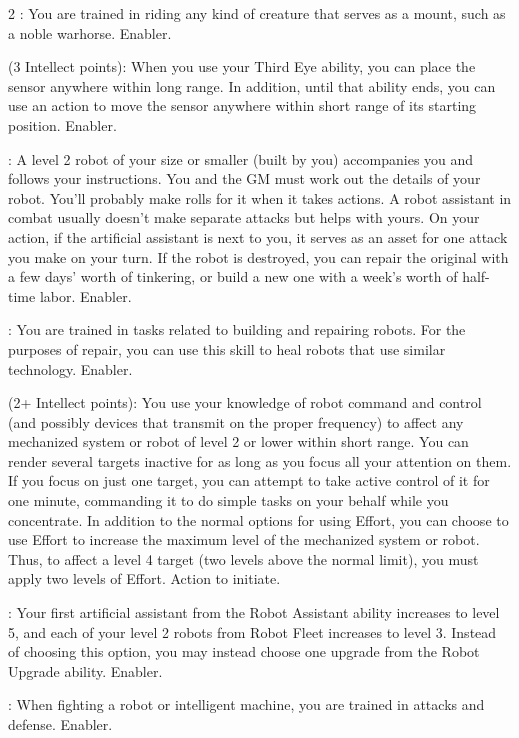\begin{multicols}{2}
: You are trained in riding any kind of creature that serves as a mount, such as a noble warhorse. Enabler. 
 
 (3 Intellect points): When you use your Third Eye ability, you can place the sensor anywhere within long range. In addition, until that ability ends, you can use an action to move the sensor anywhere within short range of its starting position. Enabler. 
 
: A level 2 robot of your size or smaller (built by you) accompanies you and follows your instructions. You and the GM must work out the details of your robot. You’ll probably make rolls for it when it takes actions. A robot assistant in combat usually doesn’t make separate attacks but helps with yours. On your action, if the artificial assistant is next to you, it serves as an asset for one attack you make on your turn. If the robot is destroyed, you can repair the original with a few days’ worth of tinkering, or build a new one with a week’s worth of half-time labor. Enabler. 
 
: You are trained in tasks related to building and repairing robots. For the purposes of repair, you can use this skill to heal robots that use similar technology. Enabler. 
 
 (2+ Intellect points): You use your knowledge of robot command and control (and possibly devices that transmit on the proper frequency) to affect any mechanized system or robot of level 2 or lower within short range. You can render several targets inactive for as long as you focus all your attention on them. If you focus on just one target, you can attempt to take active control of it for one minute, commanding it to do simple tasks on your behalf while you concentrate. In addition to the normal options for using Effort, you can choose to use Effort to increase the maximum level of the mechanized system or robot. Thus, to affect a level 4 target (two levels above the normal limit), you must apply two levels of Effort. Action to initiate. 
 
: Your first artificial assistant from the Robot Assistant ability increases to level 5, and each of your level 2 robots from Robot Fleet increases to level 3. Instead of choosing this option, you may instead choose one upgrade from the Robot Upgrade ability. Enabler. 
 
: When fighting a robot or intelligent machine, you are trained in attacks and defense. Enabler. 
 

\end{multicols}
